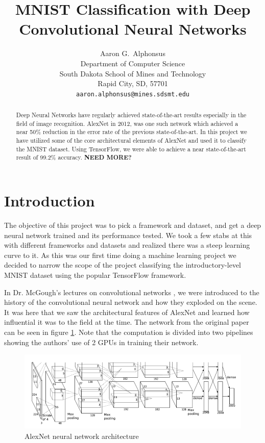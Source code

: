 \documentclass{article}
\title{MNIST Classification with Deep Convolutional Neural Networks}
\author{
  Aaron G.~Alphonsus \\
  Department of Computer Science \\
  South Dakota School of Mines and Technology \\
  Rapid City, SD, 57701 \\
  \texttt{aaron.alphonsus@mines.sdsmt.edu} \\
}
\begin{document}

\maketitle


\begin{abstract}
Deep Neural Networks have regularly achieved state-of-the-art results especially 
in the field of image recognition. AlexNet in 2012, was one such network which achieved a near 50\% reduction in the error rate of the previous state-of-the-art. In this project we have utilized some of the core architectural elements of AlexNet and used it to classify the MNIST dataset. Using TensorFlow, we were able to achieve a near state-of-the-art result of 99.2\% accuracy. \textbf{NEED MORE?}
\end{abstract}


\section{Introduction}

The objective of this project was to pick a framework and dataset, and get 
a deep neural network trained and its performance tested. We took a few stabs at 
this with different frameworks and datasets and realized there was a steep 
learning curve to it. As this was our first time doing a machine learning 
project we decided to narrow the scope of the project classifying the 
introductory-level MNIST \cite{mnist} dataset using the popular TensorFlow framework.  

In Dr. McGough's lectures on convolutional networks \cite{convnets}, we were introduced to the history of the convolutional neural network and how they exploded on the scene. It was here that we saw the architectural features of AlexNet and learned how influential it was to the field at the time. The network from the original paper can be seen in figure \ref{fig:alexnet}. Note that the computation is divided into two pipelines showing the authors' use of 2 GPUs in training their network.

\begin{figure}[h]
	\includegraphics[width=\textwidth]{alexnet.png}
    \caption{AlexNet neural network architecture}
    \label{fig:alexnet}
\end{figure}
\end{document}
